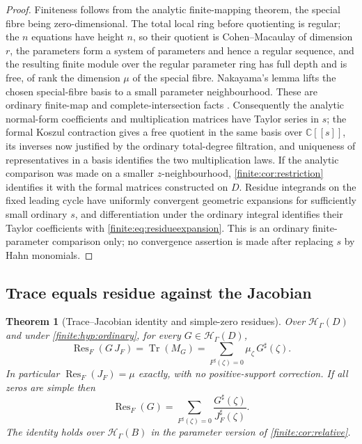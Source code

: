 \documentclass[11pt,letterpaper]{article}
\newtheorem{theorem}{Theorem}[section]
\theoremstyle{definition}
\theoremstyle{remark}
\newcommand{\C}{\mathbb C}
\newcommand{\HH}{\mathscr H}
\newcommand{\sh}{^{\sharp}}
\DeclareMathOperator{\Res}{Res}
\DeclareMathOperator{\Tr}{Tr}
\numberwithin{equation}{section}
\begin{document}
\begin{proof}
Finiteness follows from the analytic finite-mapping theorem, the special fibre being zero-dimensional. The total local ring before quotienting is regular; the $n$ equations have height $n$, so their quotient is Cohen--Macaulay of dimension $r$, the parameters form a system of parameters and hence a regular sequence, and the resulting finite module over the regular parameter ring has full depth and is free, of rank the dimension $\mu$ of the special fibre. Nakayama's lemma lifts the chosen special-fibre basis to a small parameter neighbourhood. These are ordinary finite-map and complete-intersection facts \cite{finite:GunningRossi,finite:Demailly,finite:Kunz}. Consequently the analytic normal-form coefficients and multiplication matrices have Taylor series in $s$; the formal Koszul contraction gives a free quotient in the same basis over $\C[[s]]$, its inverses now justified by the ordinary total-degree filtration, and uniqueness of representatives in a basis identifies the two multiplication laws. If the analytic comparison was made on a smaller $z$-neighbourhood, \cref{finite:cor:restriction} identifies it with the formal matrices constructed on $D$. Residue integrands on the fixed leading cycle have uniformly convergent geometric expansions for sufficiently small ordinary $s$, and differentiation under the ordinary integral identifies their Taylor coefficients with \eqref{finite:eq:residueexpansion}. This is an ordinary finite-parameter comparison only; no convergence assertion is made after replacing $s$ by Hahn monomials.
\end{proof}

\subsection{Trace equals residue against the Jacobian}
\label{finite:sec:tracejac}

\begin{theorem}[Trace--Jacobian identity and simple-zero residues]
\label{finite:thm:trace}
Over $\HH_\Gamma(D)$ and under \cref{finite:hyp:ordinary}, for every $G\in\HH_\Gamma(D)$,
\begin{equation}\label{finite:eq:tracejac}
 \Res_F(G\,J_F)=\Tr(M_G)=\sum_{F\sh(\zeta)=0}\mu_\zeta\,G\sh(\zeta).
\end{equation}
In particular $\Res_F(J_F)=\mu$ \emph{exactly}, with no positive-support correction. If all zeros are simple then
\begin{equation}\label{finite:eq:simpleresidue}
 \Res_F(G)=\sum_{F\sh(\zeta)=0}\frac{G\sh(\zeta)}{J_F\sh(\zeta)} .
\end{equation}
The identity holds over $\HH_\Gamma(B)$ in the parameter version of \cref{finite:cor:relative}.
\end{theorem}
\end{document}

